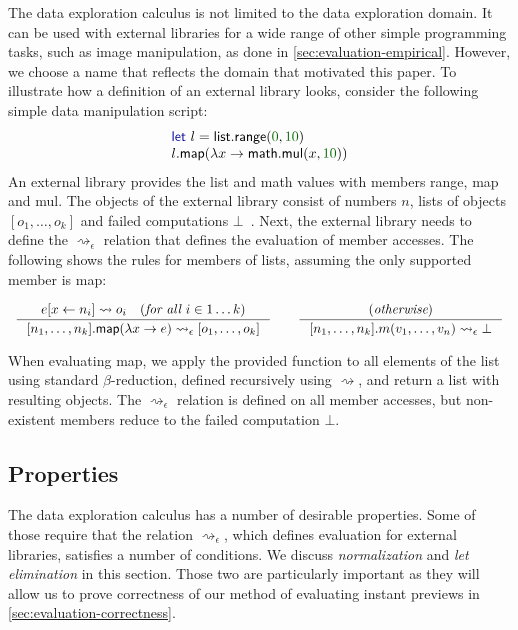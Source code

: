 \documentclass[english,crc,references=cleveref]{programming}
\theoremstyle{plain}
\theoremstyle{definition}
\newcommand{\Num}[1]{\num[color=numclr]{#1}}
\newcommand{\ident}[1]{\textnormal{\textcolor{idclr}{\sffamily #1}}}
\newcommand{\kvd}[1]{\textnormal{\textcolor{kvdclr}{\sffamily #1}}}
\begin{document}
The data exploration calculus is not limited to the data exploration domain.
It can be used with external libraries for a wide range of other simple programming tasks, such as image
manipulation, as done in \cref{sec:evaluation-empirical}. However, we choose a name that reflects the
domain that motivated this paper. To illustrate how a definition of an external library looks,
consider the following simple data manipulation script:
%
\begin{equation*}
\begin{array}{l}
\kvd{let}~l = \ident{list}.\ident{range}(\Num{0}, \Num{10})\\
l.\ident{map}(\lambda x \rightarrow \ident{math}.\ident{mul}(x, \Num{10}))
\end{array}
\end{equation*}
%
An external library provides the \ident{list} and \ident{math} values with members
\ident{range}, \ident{map} and \ident{mul}. The objects of the external library consist of
numbers $n$, lists of objects $[o_1, \ldots, o_k]$ and failed computations $\bot$~\cite{gowrong}.
Next, the external library needs to define the $\rightsquigarrow_\epsilon$ relation that defines
the evaluation of member accesses. The following shows the rules for members of lists, assuming
the only supported member is \ident{map}:
%
\begin{equation*}
\begin{array}{l}
\\[-0.75em]
\inference
  {e[x \leftarrow n_i] \rightsquigarrow o_i \quad (\textit{for all $i\in 1\ldots k$})}
  {[ n_1, \ldots, n_k ].\ident{map}(\lambda x\rightarrow e) \rightsquigarrow_\epsilon [ o_1, \ldots, o_k ]}
\qquad
\inference
  {(\textit{otherwise})}
  {[ n_1, \ldots, n_k ].m(v_1, \ldots, v_n) \rightsquigarrow_\epsilon \bot}
\\[-0.75em]
~
\end{array}
\end{equation*}
%
When evaluating \ident{map}, we apply the provided function to all elements of the list using
standard $\beta$-reduction, defined recursively using $\rightsquigarrow$, and return a list with
resulting objects. The $\rightsquigarrow_\epsilon$ relation is defined on all member accesses,
but non-existent members reduce to the failed computation $\bot$.

\subsection{Properties}
The data exploration calculus has a number of desirable properties. Some of those require that the
relation $\rightsquigarrow_\epsilon$, which defines evaluation for external libraries, satisfies a
number of conditions. We discuss \emph{normalization} and \emph{let elimination} in this section.
Those two are particularly important as they will allow us to prove correctness of our method of
evaluating instant previews in \cref{sec:evaluation-correctness}.
\end{document}
